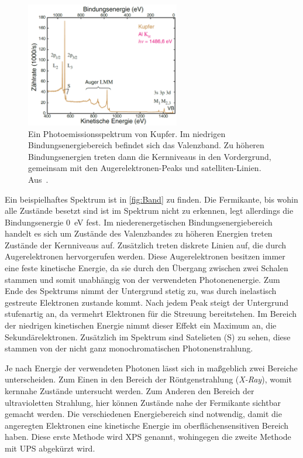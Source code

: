         \begin{figure}
            \centering
            \includegraphics[width=0.6\textwidth]{Band}
            \caption{Ein Photoemissionsspektrum von Kupfer.
            Im niedrigen Bindungsenergiebereich befindet sich das Valenzband. 
            Zu höheren Bindungsenergien treten dann die Kernniveaus in den Vordergrund, gemeinsam mit den Augerelektronen-Peaks und satelliten-Linien.
            Aus~\cite{Fauster}.}
            \label{fig:Band}
        \end{figure}
        Ein beispielhaftes Spektrum ist in \autoref{fig:Band} zu finden.
        Die Fermikante, bis wohin alle Zustände besetzt sind ist im Spektrum nicht zu erkennen, legt allerdings die Bindungsenergie \SI{0}{\electronvolt} fest.
        Im niederenergetischen Bindungsenergiebereich handelt es sich um Zustände des Valenzbandes zu höheren Energien treten Zustände der Kernniveaus auf.
        Zusätzlich treten diskrete Linien auf, die durch Augerelektronen hervorgerufen werden.
        Diese Augerelektronen besitzen immer eine feste kinetische Energie, da sie durch den Übergang zwischen zwei Schalen stammen und somit unabhängig von der verwendeten Photonenenergie.
        Zum Ende des Spektrums nimmt der Untergrund stetig zu, was durch inelastisch gestreute Elektronen zustande kommt.
        Nach jedem Peak steigt der Untergrund stufenartig an, da vermehrt Elektronen für die Streuung bereitstehen.
        Im Bereich der niedrigen kinetischen Energie nimmt dieser Effekt ein Maximum an, die Sekundärelektronen.
        Zusätzlich im Spektrum sind Satelieten (S) zu sehen, diese stammen von der nicht ganz monochromatischen Photonenstrahlung. %

        Je nach Energie der verwendeten Photonen lässt sich in maßgeblich zwei Bereiche unterscheiden.
        Zum Einen in den Bereich der Röntgenstrahlung (\textit{X-Ray}), womit kernnahe Zustände untersucht werden.
        Zum Anderen den Bereich der ultravioletten Strahlung, hier können Zustände nahe der Fermikante sichtbar gemacht werden.
        Die verschiedenen Energiebereich sind notwendig, damit die angeregten Elektronen eine kinetische Energie im oberflächensensitiven Bereich haben.
        Diese erste Methode wird XPS genannt, wohingegen die zweite Methode mit UPS abgekürzt wird.


